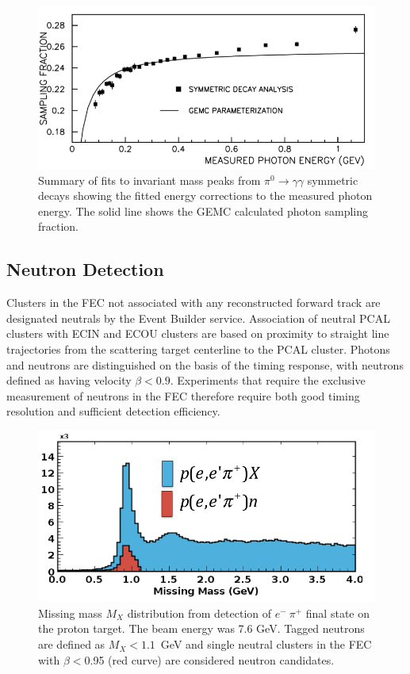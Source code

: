 \begin{figure}[h]
\centering
\includegraphics[width=1.0\columnwidth,keepaspectratio]{img/fx-study-summary-2.png}
\caption[]{Summary of fits to invariant mass peaks from $\pi^0 \rightarrow \gamma \gamma$ symmetric decays showing the fitted energy corrections to the measured photon energy.  The solid line shows the GEMC calculated photon sampling fraction.}
\label{fig:fx-study-summary-2}
\end{figure}

\subsection{Neutron Detection}
Clusters in the FEC not associated with any reconstructed forward track are designated neutrals by the Event Builder service.  Association of neutral PCAL clusters with ECIN and ECOU clusters are based on proximity to straight line trajectories from the scattering target centerline to the PCAL cluster.  Photons and neutrons are distinguished on the basis of the timing response, with neutrons defined as having velocity $\beta < 0.9$.  Experiments that require the exclusive measurement of neutrons in the FEC therefore require both good timing resolution and sufficient detection efficiency. 

\begin{figure}[h]
\centering
\includegraphics[width=1.0\columnwidth,keepaspectratio]{img/S10_4_0.png}
\caption[]{Missing mass $M_X$ distribution from detection of $e^-~\pi^+$ final state on the proton target.  The beam energy was 7.6 GeV.  Tagged neutrons are defined as $M_X < 1.1$~GeV and single neutral clusters in the FEC with $\beta<$0.95 (red curve) are considered neutron candidates.}
\label{fig:S10_4_0}
\end{figure}

